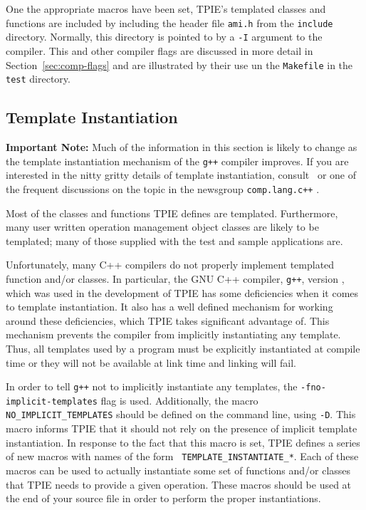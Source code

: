 One the appropriate macros have been set, TPIE's templated classes and
functions are included by including the header file {\tt ami.h} from
the {\tt include} directory.  Normally, this directory is pointed to
by a {\tt -I} argument to the compiler.  This and other compiler flags
are discussed in more detail in Section~\ref{sec:comp-flags} and are
illustrated by their use un the {\tt Makefile} in the
{\tt test} directory.
 
\subsection{Template Instantiation}

{\bf Important Note:} Much of the information in this section is
likely to change as the template instantiation mechanism of the 
{\tt g++} compiler improves.  If you are
interested in the nitty gritty details of template instantiation,
consult~\cite{ellis:arm} or one of the frequent discussions on the
topic in the newsgroup {\tt comp.lang.c++}
.

\noindent Most of the classes and functions TPIE defines are
templated.  Furthermore, many user written operation management
object classes are
likely to be templated; many of those supplied with the test and
sample applications are.

Unfortunately, many C++ compilers do not properly implement
templated function and/or classes.  In particular, the GNU C++
compiler, {\tt g++}, version \gxxversion, which
was used in the development of TPIE has some deficiencies when it
comes to template instantiation.  It also has a well defined mechanism
for working around these deficiencies, which TPIE takes significant
advantage of.  This mechanism prevents the compiler from implicitly
instantiating any template.  Thus, all templates used by a program
must be explicitly instantiated at compile time or they will not be
available at link time and linking will fail.

In order to tell {\tt g++} not to implicitly
instantiate any templates, the {\tt -fno-implicit-templates} flag is
used.  Additionally, the macro {\tt NO\_IMPLICIT\_TEMPLATES} should be
defined on the command line, using {\tt -D}.  This macro informs TPIE
that it should not rely on the presence of implicit template
instantiation.  In response to the fact that this macro is set, TPIE
defines a series of new macros with names of the form {\tt
  TEMPLATE\_INSTANTIATE\_*}.  
Each of these macros can be used to
actually instantiate some set of functions and/or classes that TPIE
needs to provide a given operation.  These macros should be used at
the end of your source file in order to perform the proper
instantiations.

